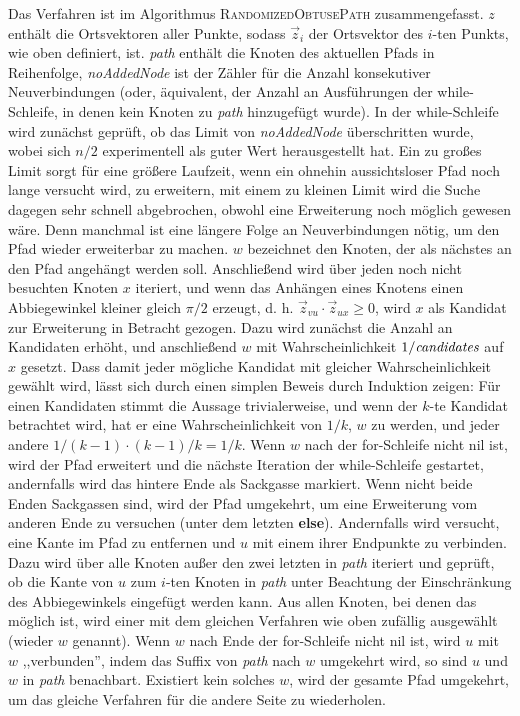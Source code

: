 \documentclass[a4paper, 10pt, ngerman]{article}
\begin{document}
Das Verfahren ist im Algorithmus \textsc{RandomizedObtusePath} zusammengefasst. $z$ enthält die Ortsvektoren aller Punkte, sodass $\vec z_i$ der Ortsvektor des $i$-ten Punkts, wie oben definiert, ist. \emph{path} enthält die Knoten des aktuellen Pfads in Reihenfolge, \emph{noAddedNode} ist der Zähler für die Anzahl konsekutiver Neuverbindungen (oder, äquivalent, der Anzahl an Ausführungen der while-Schleife, in denen kein Knoten zu \emph{path} hinzugefügt wurde). In der while-Schleife wird zunächst geprüft, ob das Limit von \emph{noAddedNode} überschritten wurde, wobei sich $n/2$ experimentell als guter Wert herausgestellt hat. Ein zu großes Limit sorgt für eine größere Laufzeit, wenn ein ohnehin aussichtsloser Pfad noch lange versucht wird, zu erweitern, mit einem zu kleinen Limit wird die Suche dagegen sehr schnell abgebrochen, obwohl eine Erweiterung noch möglich gewesen wäre. Denn manchmal ist eine längere Folge an Neuverbindungen nötig, um den Pfad wieder erweiterbar zu machen. $w$ bezeichnet den Knoten, der als nächstes an den Pfad angehängt werden soll. Anschließend wird über jeden noch nicht besuchten Knoten $x$ iteriert, und wenn das Anhängen eines Knotens einen Abbiegewinkel kleiner gleich $\pi / 2$ erzeugt, d. h. $\vec z_{vu} \cdot \vec z_{ux} \ge 0$, wird $x$ als Kandidat zur Erweiterung in Betracht gezogen. Dazu wird zunächst die Anzahl an Kandidaten erhöht, und anschließend $w$ mit Wahrscheinlichkeit $1 / \emph{candidates}$ auf $x$ gesetzt. Dass damit jeder mögliche Kandidat mit gleicher Wahrscheinlichkeit gewählt wird, lässt sich durch einen simplen Beweis durch Induktion zeigen: Für einen Kandidaten stimmt die Aussage trivialerweise, und wenn der $k$-te Kandidat betrachtet wird, hat er eine Wahrscheinlichkeit von $1/k$, $w$ zu werden, und jeder andere $1/(k-1) \cdot (k - 1) / k = 1 / k$. Wenn $w$ nach der for-Schleife nicht nil ist, wird der Pfad erweitert und die nächste Iteration der while-Schleife gestartet, andernfalls wird das hintere Ende als Sackgasse markiert. Wenn nicht beide Enden Sackgassen sind, wird der Pfad umgekehrt, um eine Erweiterung vom anderen Ende zu versuchen (unter dem letzten \textbf{else}). Andernfalls wird versucht, eine Kante im Pfad zu entfernen und $u$ mit einem ihrer Endpunkte zu verbinden. Dazu wird über alle Knoten außer den zwei letzten in \emph{path} iteriert und geprüft, ob die Kante von $u$ zum $i$-ten Knoten in \emph{path} unter Beachtung der Einschränkung des Abbiegewinkels eingefügt werden kann. Aus allen Knoten, bei denen das möglich ist, wird einer mit dem gleichen Verfahren wie oben zufällig ausgewählt (wieder $w$ genannt). Wenn $w$ nach Ende der for-Schleife nicht nil ist, wird $u$ mit $w$ ,,verbunden'', indem das Suffix von \emph{path} nach $w$ umgekehrt wird, so sind $u$ und $w$ in \emph{path} benachbart. Existiert kein solches $w$, wird der gesamte Pfad umgekehrt, um das gleiche Verfahren für die andere Seite zu wiederholen.
\end{document}

